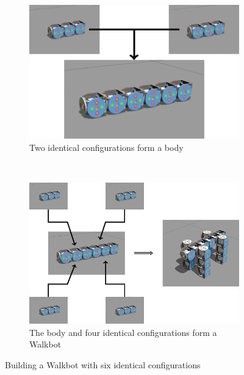 \documentclass[conference]{IEEEtran}
\theoremstyle{definition}
\begin{document}
\begin{figure}
\begin{center}
        \begin{subfigure}[b]{0.6\columnwidth}
                \includegraphics[width=\textwidth]{images/tikz/walkbot.pdf}
                \caption{Two identical configurations form a body}
                \label{fig:walkbot1}
           \end{subfigure}
           ~
        \begin{subfigure}[b]{0.9\columnwidth}
                \includegraphics[width=\textwidth]{images/tikz/walkbot2.pdf}
                \caption{The body and four identical configurations form a Walkbot}
                \label{fig:walkbot2}
        \end{subfigure}
\end{center}
\caption{Building a Walkbot with six identical configurations}
\label{fig:walkbot}
\end{figure}
\end{document}
